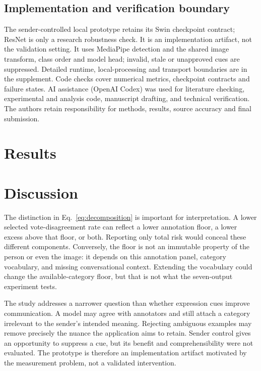 \documentclass[pdflatex,sn-mathphys-num]{sn-jnl}
\begin{document}
\subsection{Implementation and verification boundary}
The sender-controlled local prototype retains its Swin checkpoint contract; ResNet is only a research robustness check. It is an implementation artifact, not the validation setting. It uses MediaPipe detection \cite{lugaresi2019mediapipe} and the shared image transform, class order and model head; invalid, stale or unapproved cues are suppressed. Detailed runtime, local-processing and transport boundaries are in the supplement. Code checks cover numerical metrics, checkpoint contracts and failure states. AI assistance (OpenAI Codex) was used for literature checking, experimental and analysis code, manuscript drafting, and technical verification. The authors retain responsibility for methods, results, source accuracy and final submission.

\section{Results}


\section{Discussion}


The distinction in Eq.~\ref{eq:decomposition} is important for interpretation. A lower selected vote-disagreement rate can reflect a lower annotation floor, a lower excess above that floor, or both. Reporting only total risk would conceal these different components. Conversely, the floor is not an immutable property of the person or even the image: it depends on this annotation panel, category vocabulary, and missing conversational context. Extending the vocabulary could change the available-category floor, but that is not what the seven-output experiment tests.

The study addresses a narrower question than whether expression cues improve communication. A model may agree with annotators and still attach a category irrelevant to the sender's intended meaning. Rejecting ambiguous examples may remove precisely the nuance the application aims to retain. Sender control gives an opportunity to suppress a cue, but its benefit and comprehensibility were not evaluated. The prototype is therefore an implementation artifact motivated by the measurement problem, not a validated intervention.
\end{document}
